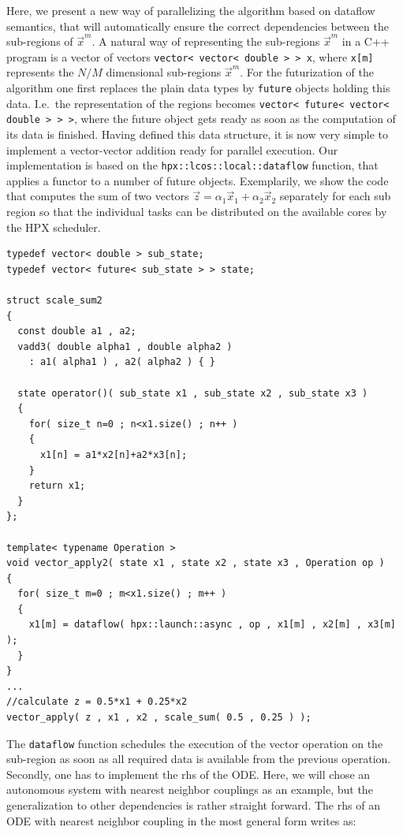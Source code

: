\documentclass[a4wide,10pt]{scrartcl}
\begin{document}
Here, we present a new way of parallelizing the algorithm based on dataflow semantics, that will automatically ensure the correct dependencies between the sub-regions of $\vec x^m$.
A natural way of representing the sub-regions $\vec x^m$ in a C++ program is a vector of vectors \lstinline+vector< vector< double > > x+, where \lstinline+x[m]+ represents the $N/M$ dimensional sub-regions $\vec x^m$.
For the futurization of the algorithm one first replaces the plain data types by \lstinline+future+ objects holding this data.
I.e.\ the representation of the regions becomes \lstinline+vector< future< vector< double > > >+, where the future object gets ready as soon as the computation of its data is finished.
Having defined this data structure, it is now very simple to implement a vector-vector addition ready for parallel execution.
Our implementation is based on the \lstinline+hpx::lcos::local::dataflow+ function, that applies a functor to a number of future objects.
Exemplarily, we show the code that computes the sum of two vectors $\vec z = \alpha_1 \vec x_1 + \alpha_2 \vec x_2$ separately for each sub region so that the individual tasks can be distributed on the available cores by the HPX scheduler.
\begin{lstlisting}
typedef vector< double > sub_state;
typedef vector< future< sub_state > > state;

struct scale_sum2
{
  const double a1 , a2;
  vadd3( double alpha1 , double alpha2 )
    : a1( alpha1 ) , a2( alpha2 ) { }
    
  state operator()( sub_state x1 , sub_state x2 , sub_state x3 )
  {
    for( size_t n=0 ; n<x1.size() ; n++ )
    {
      x1[n] = a1*x2[n]+a2*x3[n];
    }
    return x1;
  }
};

template< typename Operation >
void vector_apply2( state x1 , state x2 , state x3 , Operation op )
{
  for( size_t m=0 ; m<x1.size() ; m++ )
  {
    x1[m] = dataflow( hpx::launch::async , op , x1[m] , x2[m] , x3[m] );
  }
}
...
//calculate z = 0.5*x1 + 0.25*x2
vector_apply( z , x1 , x2 , scale_sum( 0.5 , 0.25 ) );
\end{lstlisting}
The \lstinline+dataflow+ function schedules the execution of the vector operation on the sub-region as soon as all required data is available from the previous operation.
Secondly, one has to implement the rhs of the ODE.
Here, we will chose an autonomous system with nearest neighbor couplings as an example, but the generalization to other dependencies is rather straight forward.
The rhs of an ODE with nearest neighbor coupling in the most general form writes as:
\end{document}
